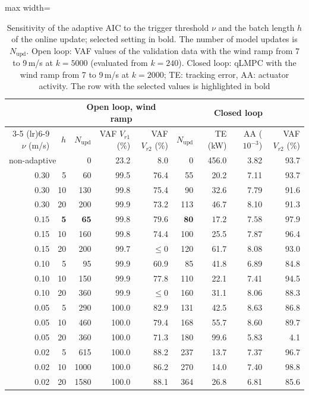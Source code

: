 \begin{table}[h!]
    \centering
    \caption[Sensitivity of the adaptive AIC to the update settings]{Sensitivity of the adaptive AIC to the trigger threshold $\nu$ and the batch length $h$ of the online update; selected setting in bold. The number of model updates is $N_\text{upd}$. Open loop: VAF values of the validation data with the wind ramp from 7 to 9\,m/s at $k = 5000$ (evaluated from $k = 240$). Closed loop: qLMPC with the wind ramp from 7 to 9\,m/s at $k = 2000$; TE: tracking error, AA: actuator activity. The row with the selected values is highlighted in bold}
    \label{tab:sensitivityAdaptiveAIC}
    \begin{adjustbox}{max width=\textwidth}
        \begin{tabular}{rr rrr rrrr}
            \toprule
            & & \multicolumn{3}{c}{Open loop, wind ramp} & \multicolumn{4}{c}{Closed loop} \\
            \cmidrule(lr){3-5} \cmidrule(lr){6-9}
            $\nu$ (m/s) & $h$ & $N_\text{upd}$ & VAF $V_{r1}$ (\%) & VAF $V_{r2}$ (\%) & $N_\text{upd}$ & TE (kW) & AA ($10^{-3}$) & VAF $V_{r2}$ (\%) \\
            \midrule
            \multicolumn{2}{l}{non-adaptive} & 0 & 23.2 & 8.0 & 0 & 456.0 & 3.82 & 93.7 \\ \midrule
            0.30 & 5 & 60 & 99.5 & 76.4 & 55 & 20.2 & 7.11 & 93.7 \\
            0.30 & 10 & 130 & 99.8 & 75.4 & 90 & 32.6 & 7.79 & 91.6 \\
            0.30 & 20 & 200 & 99.9 & 73.2 & 113 & 46.7 & 8.10 & 91.3 \\ \midrule
            $\bm{0.15}$ & $\bm{5}$ & $\bm{65}$ & $\bm{99.8}$ & $\bm{79.6}$ & $\bm{80}$ & $\bm{17.2}$ & $\bm{7.58}$ & $\bm{97.9}$ \\
            0.15 & 10 & 160 & 99.8 & 74.4 & 100 & 25.5 & 7.87 & 96.4 \\
            0.15 & 20 & 200 & 99.7 & $\leq 0$ & 120 & 61.7 & 8.08 & 93.0 \\ \midrule
            0.10 & 5 & 95 & 99.9 & 60.9 & 85 & 41.8 & 6.89 & 84.8 \\
            0.10 & 10 & 150 & 99.9 & 77.8 & 110 & 22.1 & 7.41 & 94.5 \\
            0.10 & 20 & 360 & 99.9 & $\leq 0$ & 160 & 31.1 & 8.06 & 88.3 \\ \midrule
            0.05 & 5 & 290 & 100.0 & 82.9 & 131 & 42.5 & 8.63 & 86.8 \\
            0.05 & 10 & 460 & 100.0 & 79.4 & 168 & 55.7 & 8.60 & 89.7 \\
            0.05 & 20 & 360 & 100.0 & 71.3 & 180 & 99.6 & 5.83 & 4.1 \\ \midrule
            0.02 & 5 & 615 & 100.0 & 88.2 & 237 & 13.7 & 7.37 & 96.7 \\
            0.02 & 10 & 1000 & 100.0 & 86.2 & 270 & 14.0 & 7.40 & 98.8 \\
            0.02 & 20 & 1580 & 100.0 & 88.1 & 364 & 26.8 & 6.81 & 85.6 \\
            \bottomrule
        \end{tabular}
    \end{adjustbox}
\end{table}

